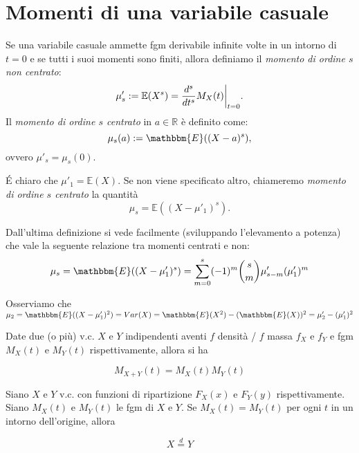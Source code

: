 \section{Momenti di una variabile casuale}

\begin{dfn}
Se una variabile casuale ammette fgm derivabile infinite volte in un intorno di \(t=0\) e se tutti i suoi momenti sono finiti, allora definiamo il \emph{momento di ordine \(s\) non centrato}: 
\begin{equation}
  \mu'_s := \mathbb{E}(X^s) = \restr{\frac{d^s}{dt^s} M_X(t)}{t=0}.
\end{equation} 
Il \emph{momento di ordine \(s\) centrato} in \(a \in \mathbb{R}\) è definito come: 
\begin{equation}
  \mu_s (a) := \mathbbm{E} ((X-a)^s),
\end{equation}
ovvero $\mu'_s = \mu_s (0)$.

\end{dfn}

\begin{oss}
  \'E chiaro che \(\mu'_1 = \mathbb{E}(X)\). Se non viene specificato altro, chiameremo \emph{momento di ordine \(s\) centrato} la quantità
  \begin{equation}
    \mu_s = \mathbb{E}((X-\mu'_1)^s).
  \end{equation}
\end{oss}

\begin{teo}
Dall'ultima definizione si vede facilmente (sviluppando l'elevamento a potenza) che vale la seguente relazione tra momenti centrati e non:
$$\mu_s = \mathbbm{E} ((X-\mu'_1)^s) = \displaystyle\sum_{m=0}^s (-1)^m \binom{s}{m} \mu'_{s-m} (\mu'_1)^m$$
\end{teo}
Osserviamo che $\mu_2 = \mathbbm{E} ((X-\mu'_1)^2) = Var(X) = \mathbbm{E} (X^2) - (\mathbbm{E} (X))^2 = \mu'_2 - (\mu'_1)^2$


\begin{teo}
Date due (o più) v.c. $X$ e $Y$ indipendenti aventi $f$ densità / $f$ massa $f_X$ e $f_Y$ e fgm $M_X(t)$ e $M_Y(t)$ rispettivamente, allora si ha

$$M_{X+Y}(t) = M_X(t) M_Y(t)$$
\end{teo}

\begin{teo}
Siano $X$ e $Y$ v.c. con funzioni di ripartizione $F_X(x)$ e $F_Y(y)$ rispettivamente. Siano $M_X(t)$ e $M_Y(t)$ le fgm di $X$ e $Y$. Se $M_X(t) = M_Y(t)$ per ogni $t$ in un intorno dell'origine, allora 

$$X \stackrel{d}{=} Y$$
\end{teo}

